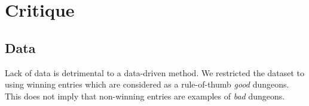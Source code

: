 \documentclass{UoYCSproject}
\begin{document}
\section{Critique}

\subsection{Data}
Lack of data is detrimental to a data-driven method. We restricted the dataset to using winning entries which are considered as a rule-of-thumb \textit{good} dungeons. This does not imply that non-winning entries are examples of \textit{bad} dungeons.
\end{document}
